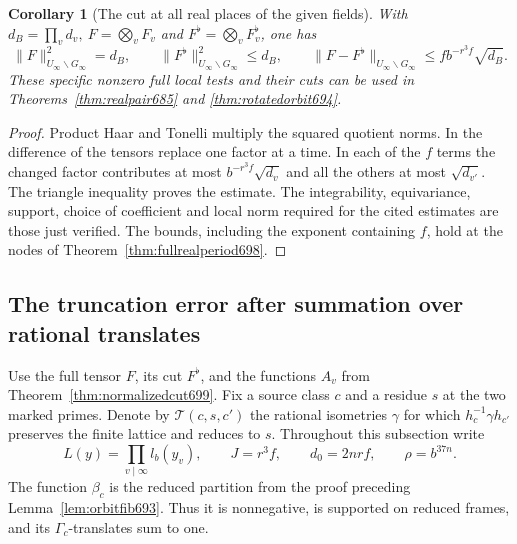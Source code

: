 \documentclass[a4paper,11pt]{article}
\newtheorem{corollary}[proposition]{Corollary}
\theoremstyle{definition}
\theoremstyle{remark}
\numberwithin{equation}{section}
\begin{document}
\begin{corollary}[The cut at all real places of the given fields]\leavevmode
\label{cor:globalrealcut699}
With \(d_B=\prod_v d_v,\ F=\bigotimes_v F_v\) and
\(F^\flat=\bigotimes_v F_v^\flat\), one has
\[
 \|F\|_{U_\infty\backslash G_\infty}^2=d_B,\qquad
 \|F^\flat\|_{U_\infty\backslash G_\infty}^2\le d_B,\qquad
 \|F-F^\flat\|_{U_\infty\backslash G_\infty}
                          \le f b^{-r^3 f}\sqrt{d_B}.
\]
These specific nonzero full local tests and their cuts can
be used in Theorems~\ref{thm:realpair685} and
\ref{thm:rotatedorbit694}.
\end{corollary}
\begin{proof}
Product Haar and Tonelli multiply the squared quotient norms.
In the difference of the tensors replace one factor at a time.
In each of the \(f\) terms the changed factor contributes at
most \(b^{-r^3f}\sqrt{d_v}\) and all the others at most
\(\sqrt{d_{v'}}\). The triangle inequality proves the estimate.
The integrability, equivariance, support, choice of coefficient
and local norm required for the cited estimates are those just
verified. The bounds, including the exponent containing \(f\),
hold at the nodes of Theorem~\ref{thm:fullrealperiod698}.
\end{proof}


\subsection{The truncation error after summation over rational translates}
\label{sec:rationalcut700}

Use the full tensor \(F\), its cut \(F^\flat\), and the functions
\(A_v\) from Theorem~\ref{thm:normalizedcut699}. Fix a source
class \(c\) and a residue \(s\) at the two marked primes. Denote by
\(\mathcal T(c,s,c')\) the rational isometries \(\gamma\) for which
\(h_c^{-1}\gamma h_{c'}\) preserves the finite lattice and reduces
to \(s\). Throughout this subsection write
\[
 L(y)=\prod_{v\mid\infty}l_b(y_v),\qquad
 J=r^3f,\qquad d_0=2nrf,\qquad \rho=b^{37n}.
\]
The function \(\beta_c\) is the reduced partition from the proof
preceding Lemma~\ref{lem:orbitfib693}. Thus it is nonnegative,
is supported on reduced frames, and its \(\Gamma_c\)-translates
sum to one.
\end{document}
